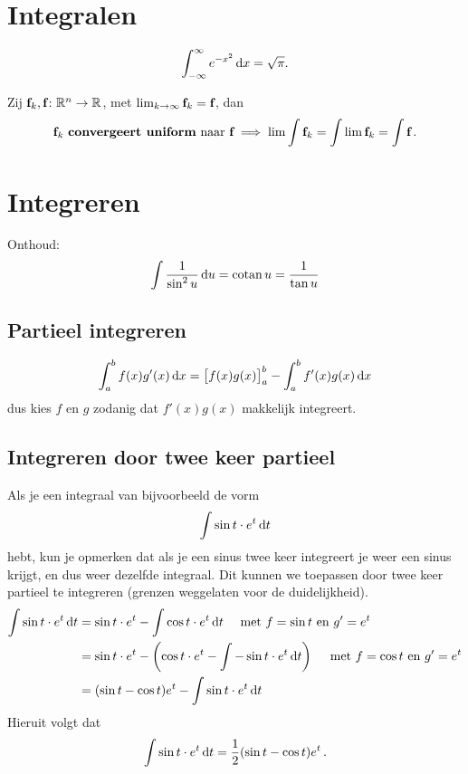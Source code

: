 \documentclass{article}
\begin{document}
 	\section{Integralen}

		\begin{stelling}
			\[ \int_{-\infty}^\infty e^{-x^2} \mathop{}\!\mathrm{d} x = \sqrt \pi .\]
		\end{stelling}

	 	\begin{stelling}
		 	Zij ${\textbf{f}}_k,{\textbf{f}} \colon \mathbb{R}^n \to \mathbb{R}$, met $\lim_{k \to \infty} {\textbf{f}}_k = {\textbf{f}}$, dan
		 	\[ {\textbf{f}}_k \text { \textbf{convergeert uniform} naar } {\textbf{f}} \implies \lim \int {\textbf{f}}_k = \int \lim {\textbf{f}}_k = \int {\textbf{f}} \,. \]
	 	\end{stelling}
	 	
	\section{Integreren}
        Onthoud:
        \begin{align*}
            \int \frac{1}{\sin^2 u} \mathop{}\!\mathrm{d} u = \operatorname{\mathop{cotan}} u = \frac{1}{\tan u}
        \end{align*}
        \subsection{Partieel integreren}
            \[
                \int_a^b f(x) g'(x) \mathop{}\!\mathrm{d} x = \big[f(x)g(x)\big]_a^b - \int_a^b f'(x) g(x) \mathop{}\!\mathrm{d} x
             \]
             dus kies $f$ en $g$ zodanig dat $f'(x)g(x)$ makkelijk integreert.

        \subsection{Integreren door twee keer partieel}
            Als je een integraal van bijvoorbeeld de vorm
            \[
                \int \sin t \cdot e^t \mathop{}\!\mathrm{d} t
            \]
            hebt, kun je opmerken dat als je een sinus twee keer integreert je weer een sinus
            krijgt, en dus weer dezelfde integraal. Dit kunnen we toepassen
            door twee keer partieel te integreren (grenzen weggelaten voor de duidelijkheid).
            \begin{align*}
                \int \sin t \cdot e^t \mathop{}\!\mathrm{d} t &= \sin t \cdot e^t - \int \cos t \cdot e^t \mathop{}\!\mathrm{d} t
                \quad \text{ met $f=\sin t$ en $g'=e^t$} \\
                &= \sin t \cdot e^t - \left( \cos t \cdot e^t - \int - \sin t \cdot e^t \mathop{}\!\mathrm{d} t \right)
                \quad \text{ met $f=\cos t$ en $g'=e^t$} \\
                &= ( \sin t - \cos t ) e^t -  \int \sin t \cdot e^t \mathop{}\!\mathrm{d} t
            \end{align*}
            Hieruit volgt dat
            \[  \int \sin t \cdot e^t \mathop{}\!\mathrm{d} t = \frac{1}{2} ( \sin t - \cos t ) e^t\,. \]
\end{document}
